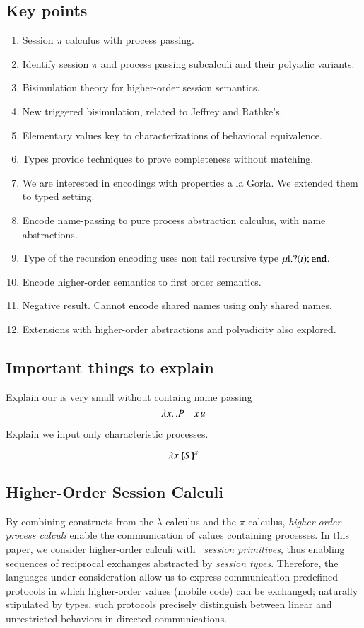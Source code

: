 \subsection{Key points}
\begin{enumerate}[1.]
	\item	Session $\pi$ calculus with process passing.
	\item	Identify session $\pi$ and process passing subcalculi and their polyadic variants.
	\item	Bisimulation theory for higher-order session semantics.
	\item	New triggered bisimulation, related to Jeffrey and Rathke's.
	\item   Elementary values key to characterizations of behavioral equivalence.
	\item	Types provide techniques to prove completeness without matching.
	\item	We are interested in encodings with properties a la Gorla. 
                We extended them to typed setting. 
	\item	Encode name-passing to pure process abstraction calculus, with name abstractions.
	\item	Type of the recursion encoding uses non tail recursive type $\mu\mathsf{t}.? (t) ; \mathtt{end}$.
	\item	Encode higher-order semantics to first order semantics.
	\item	Negative result. Cannot encode shared names using only shared names.
	\item   Extensions with higher-order abstractions and polyadicity also explored.
\end{enumerate}

\smallskip 

\subsection{Important things to explain}
Explain our \HO is very small without containg name passing 
\[ 
\lambda x.\,.P \quad x\, {u}
\]

Explain we input only characteristic processes.  

\[
\lambda x.[\!\!(S)\!\!]^{x}
\]

\subsection{Higher-Order Session Calculi}
\noi By combining constructs from the $\lambda$-calculus and the $\pi$-calculus, 
\emph{higher-order process calculi} enable the communication of values containing 
processes. In this paper, we consider higher-order calculi with ~\emph{session primitives},
thus enabling  sequences of reciprocal exchanges abstracted by \emph{session types}.
Therefore, the languages under consideration allow us to express communication predefined 
protocols in which higher-order values 
(mobile code) can be exchanged; naturally stipulated by types, 
such protocols precisely distinguish between 
linear and unrestricted behaviors in 
directed %
communications.

